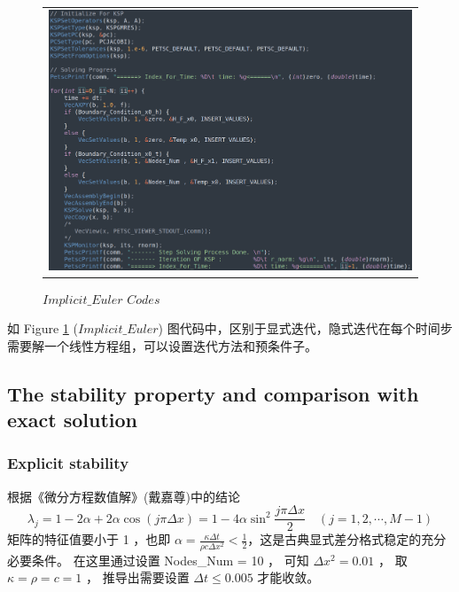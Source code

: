 \documentclass[3p]{elsarticle}
\numberwithin{equation}{section}
\begin{document}
    \begin{figure}[h]
    	\begin{center}
    		\begin{tabular}{c}
    			\includegraphics[angle=0, scale=0.13]{./figures/Implicit_Euler.png}
    		\end{tabular}
    	\end{center}
    	\caption{$ Implicit\_Euler $ $ Codes $}
    	\label{fig:illustration-Implicit_Euler}
    \end{figure}
    
    
    如 Figure \ref{fig:illustration-Implicit_Euler} ($ Implicit\_Euler $) 图代码中，区别于显式迭代，隐式迭代在每个时间步需要解一个线性方程组，可以设置迭代方法和预条件子。
    \clearpage
    \subsection{The stability property and comparison with exact solution}
    
    \subsubsection{Explicit stability}
    
    根据《微分方程数值解》(戴嘉尊)中的结论
    \begin{equation}
    	\lambda_{j}=1-2 \alpha+2 \alpha \cos (j \pi \Delta x)=1-4 \alpha \sin ^{2} \frac{j \pi \Delta x}{2} \quad(j=1,2, \cdots, M-1)
    \end{equation}
    矩阵的特征值要小于 1 ，也即 $ \alpha =  \frac{\kappa \Delta t}{ \rho c \Delta x^{2}} < \frac{1}{2} $，这是古典显式差分格式稳定的充分必要条件。
    在这里通过设置 Nodes\_Num = 10  ， 可知 $ \Delta x^{2} = 0.01 $ ， 取 $ \kappa = \rho = c = 1 $ ， 推导出需要设置 $ \Delta t \le   0.005 $ 才能收敛。
    
\end{document}
